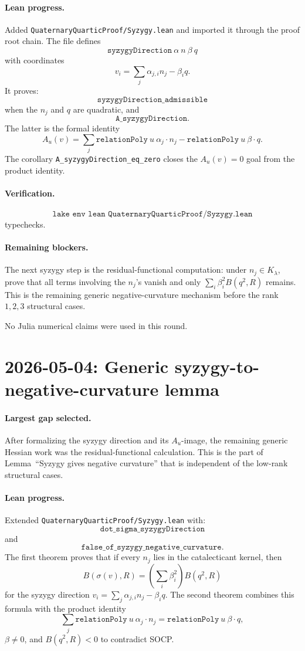 \documentclass[11pt]{article}
\begin{document}
\paragraph{Lean progress.}
Added \texttt{QuaternaryQuarticProof/Syzygy.lean} and imported it through the
proof root chain.  The file defines
\[
\texttt{syzygyDirection}\ \alpha\ n\ \beta\ q
\]
with coordinates
\[
v_i=\sum_j \alpha_{j,i}n_j-\beta_i q.
\]
It proves:
\[
\texttt{syzygyDirection\_admissible}
\]
when the \(n_j\) and \(q\) are quadratic, and
\[
\texttt{A\_syzygyDirection}.
\]
The latter is the formal identity
\[
A_u(v)
=\sum_j \texttt{relationPoly}\ u\ \alpha_j\cdot n_j
  -\texttt{relationPoly}\ u\ \beta\cdot q.
\]
The corollary \texttt{A\_syzygyDirection\_eq\_zero} closes the \(A_u(v)=0\)
goal from the product identity.

\paragraph{Verification.}
\[
\texttt{lake env lean QuaternaryQuarticProof/Syzygy.lean}
\]
typechecks.

\paragraph{Remaining blockers.}
The next syzygy step is the residual-functional computation:
under \(n_j\in K_\lambda\), prove that all terms involving the \(n_j\)'s vanish
and only \(\sum_i\beta_i^2 B(q^2,R)\) remains.  This is the remaining generic
negative-curvature mechanism before the rank \(1,2,3\) structural cases.

No Julia numerical claims were used in this round.

\section*{2026-05-04: Generic syzygy-to-negative-curvature lemma}

\paragraph{Largest gap selected.}
After formalizing the syzygy direction and its \(A_u\)-image, the remaining
generic Hessian work was the residual-functional calculation.  This is the
part of Lemma~\textup{``Syzygy gives negative curvature''} that is independent
of the low-rank structural cases.

\paragraph{Lean progress.}
Extended \texttt{QuaternaryQuarticProof/Syzygy.lean} with:
\[
\texttt{dot\_sigma\_syzygyDirection}
\]
and
\[
\texttt{false\_of\_syzygy\_negative\_curvature}.
\]
The first theorem proves that if every \(n_j\) lies in the catalecticant
kernel, then
\[
B(\sigma(v),R)
=\left(\sum_i\beta_i^2\right)B(q^2,R)
\]
for the syzygy direction \(v_i=\sum_j\alpha_{j,i}n_j-\beta_iq\).
The second theorem combines this formula with the product identity
\[
\sum_j \texttt{relationPoly}\ u\ \alpha_j\cdot n_j
=\texttt{relationPoly}\ u\ \beta\cdot q,
\]
\(\beta\ne0\), and \(B(q^2,R)<0\) to contradict SOCP.
\end{document}
